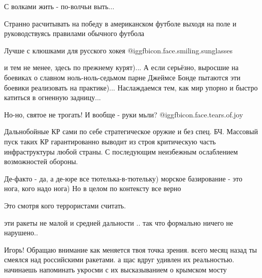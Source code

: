 \begin{itemize} %
С волками жить - по-волчьи выть...

Странно расчитывать на победу в американском футболе выходя на поле и руководствуясь правилами обычного футбола

Лучше с клюшками для русского хокея @igg{fbicon.face.smiling.sunglasses} 

и тем не менее, здесь по прежнему курят)... А если серьёзно, выросшие на боевиках о славном ноль-ноль-седьмом парне Джеймсе Бонде пытаются эти боевики реализовать на практике)... Наслаждаемся тем, как мир упорно и быстро катиться в огненную задницу...

Но-но, святое не трогать! И вообще - руки мьли? @igg{fbicon.face.tears.of.joy} 

Дальнобойные КР сами по себе стратегическое оружие и без спец. БЧ. Массовый пуск таких КР гарантированно выводит из строя критическую часть инфраструктуры любой страны. С последующим неизбежным ослаблением возможностей обороны.

Де-факто - да, а де-юре все тютелька-в-тютельку) морское базирование - это нога, кого надо нога)
Но в целом по контексту все верно

Это смотря кого террористами считать.

эти ракеты не малой и средней дальности .. так что формально ничего не нарушено..

Игорь! Обращаю внимание как меняется твоя точка зрения. всего месяц назад ты смеялся над российскими ракетами. а щас вдруг удивлен их реальностью. начинаешь напоминать укросми с их высказыванием о крымском мосту
\end{itemize} %
